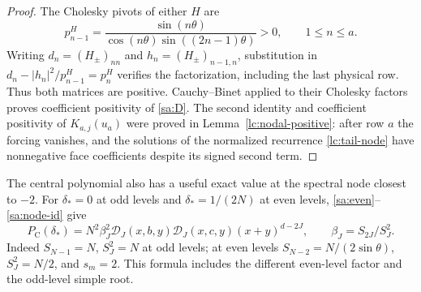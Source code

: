 \begin{proof}
The Cholesky pivots of either $H$ are
\[
 p_{n-1}^{H}=\frac{\sin(n\theta)}
                     {\cos(n\theta)\sin((2n-1)\theta)}>0,
                         \qquad1\le n\le a.
\]
Writing $d_n=(H_\pm)_{nn}$ and $h_n=(H_\pm)_{n-1,n}$, substitution
in $d_n-|h_n|^2/p_{n-1}^{H}=p_n^{H}$ verifies the
factorization, including the last physical row. Thus both matrices
are positive. Cauchy--Binet applied to their Cholesky factors proves
coefficient positivity of \eqref{sa:D}.
The second identity and coefficient positivity of $K_{a,j}(u_a)$
were proved in Lemma~\ref{lc:nodal-positive}: after row $a$ the forcing
vanishes, and the solutions of the normalized recurrence
\eqref{lc:tail-node} have nonnegative face coefficients despite its
signed second term.
\end{proof}

The central polynomial also has a useful exact value at the
spectral node closest to $-2$. For $\delta_*=0$ at odd levels and $\delta_*=1/(2N)$
at even levels, \eqref{sa:even}--\eqref{sa:node-id} give
\begin{equation}\label{sa:anchor}
 P_{\mathrm C}(\delta_*)=N^2\beta_J^2
          \mathcal D_J(x,b,y)\mathcal D_J(x,c,y)(x+y)^{d-2J},
                       \qquad \beta_J=S_{2J}/S_J^2.
\end{equation}
Indeed $S_{N-1}=N$, $S_J^2=N$ at odd levels; at even levels
$S_{N-2}=N/(2\sin\theta)$, $S_J^2=N/2$, and $s_m=2$.
This formula includes the different even-level factor and the odd-level simple root.

